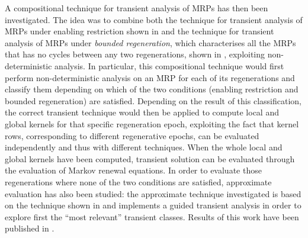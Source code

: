   A compositional technique for transient analysis of \acp{MRP} has then been investigated. The idea was to combine both the technique for transient analysis of \acp{MRP} under enabling restriction shown in \cite{german1995transient} and the technique for transient analysis of \acp{MRP} under \textit{bounded regeneration}, which characterises all the \acp{MRP} that has no cycles between any two regenerations, shown in \cite{horvath2012transient}, exploiting non-deterministic analysis. In particular, this compositional technique would first perform non-deterministic analysis on an \ac{MRP} for each of its regenerations and classify them depending on which of the two conditions (enabling restriction and bounded regeneration) are satisfied. Depending on the result of this classification, the correct transient technique would then be applied to compute local and global kernels for that specific regeneration epoch, exploiting the fact that kernel rows, corresponding to different regenerative epochs, can be evaluated independently and thus with different techniques. When the whole local and global kernels have been computed, transient solution can be evaluated through the evaluation of Markov renewal equations. In order to evaluate those regenerations where none of the two conditions are satisfied, approximate evaluation has also been studied: the approximate technique investigated is based on the technique shown in \cite{horvath2012transient} and implements a guided transient analysis in order to explore first the ``most relevant'' transient classes. Results of this work have been published in \cite{biagi2017exploiting}.
  
\newpage
